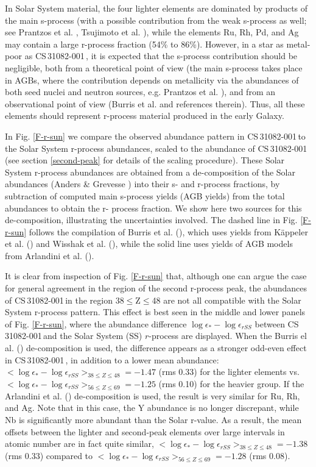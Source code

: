\documentclass{aa}
\def\cs{CS\,31082-001\,}
\begin{document}
In Solar System material, the four lighter elements are dominated by
products of the main s-process (with a possible contribution from the weak
s-process as well; see Prantzos et al. \cite{prantzos90}, Tsujimoto et al.
\cite{tsujimoto00}), while the elements Ru, Rh, Pd, and Ag may contain a large 
r-process fraction (54\% to 86\%). However, in a star as metal-poor as \cs,
it is expected that the s-process contribution should be negligible, both from
a theoretical point of view (the main s-process takes place in AGBs, where
the contribution depends on metallicity via the abundances of both seed
nuclei and neutron sources, e.g.  Prantzos et al. \cite{prantzos90}), and from
an observational point of view (Burris et al. \cite{burris00} and references
therein). Thus, all these elements should represent r-process material
produced in the early Galaxy.  

In Fig. \ref{F-r-sun} we compare the observed
abundance pattern in \cs to the Solar System r-process abundances, scaled to
the abundance of \cs (see section \ref{second-peak} for details of the scaling
procedure). These Solar System r-process abundances are obtained from a
de-composition of the Solar abundances (Anders \& Grevesse \cite{grevesse89})
into their s- and r-process fractions, by subtraction of computed main
s-process yields (AGB yields) from the total abundances to obtain the r-
process fraction. We show here two sources for this de-composition,
illustrating the uncertainties involved.  The dashed line in Fig.
\ref{F-r-sun} follows the compilation of Burris et al. (\cite{burris00}), which
uses yields from K\"appeler et al.  (\cite{kappeler89}) and Wisshak et al.
(\cite{wisshak96}), while the solid line uses yields of AGB models from
Arlandini et al.  (\cite{arlandini99}).

It is clear from inspection of Fig. \ref{F-r-sun} that, although one can
argue the case for general agreement in the region of the second r-process
peak, the abundances of \cs in the region 38$\leq$Z$\leq$48 are not all
compatible with the Solar System r-process pattern. This effect is best seen in
the middle and lower panels of Fig. \ref{F-r-sun}, where the abundance
difference $\log \epsilon_{*} - \log \epsilon_{rSS}$ between \cs and the Solar 
System (SS) $r$-process are displayed. When the Burris el al. (\cite{burris00})
de-composition is used, the difference appears as a stronger odd-even effect in
\cs, in addition to a lower mean abundance: $<\log \epsilon_{*} - \log
\epsilon_{rSS}>_{38\leq Z\leq 48}=-1.47$ (rms 0.33) for the lighter elements 
vs. $<\log \epsilon_{*} - \log \epsilon_{rSS}>_{56\leq Z\leq 69}=-1.25$ 
(rms 0.10) for the heavier group.  
If the Arlandini et al. (\cite{arlandini99}) de-composition is used,
the result is very similar for Ru, Rh, and Ag.  Note that in this
case, the Y abundance is no longer discrepant, while Nb is significantly
more abundant than the Solar r-value.  As a result, the mean offsets
between the lighter and second-peak elements over large intervals
in atomic number are in fact quite similar,  $<\log \epsilon_{*} - \log
\epsilon_{rSS}>_{38\leq Z\leq 48}=-1.38$ (rms 0.33) compared to $<\log
\epsilon_{*} - \log \epsilon_{rSS}>_{56\leq Z\leq 69}=-1.28$ (rms 0.08).
\end{document}
